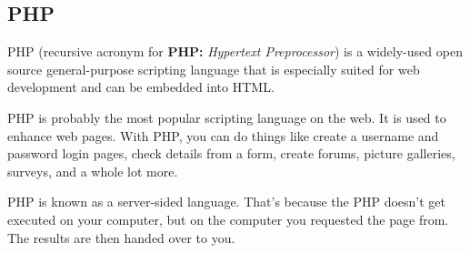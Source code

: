 \subsection{PHP}
PHP (recursive acronym for {\bf PHP:} {\em Hypertext Preprocessor}) is a widely-used open source general-purpose scripting language that is especially suited for web development and can be embedded into HTML.

PHP is probably the most popular scripting language on the web. It is used to enhance web pages. With PHP, you can do things like create a username and password login pages, check details from a form, create forums, picture galleries, surveys, and a whole lot more.
 
PHP is known as a server-sided language. That's because the PHP doesn't get executed on your computer, but on the computer you requested the page from. The results are then handed over to you. 

